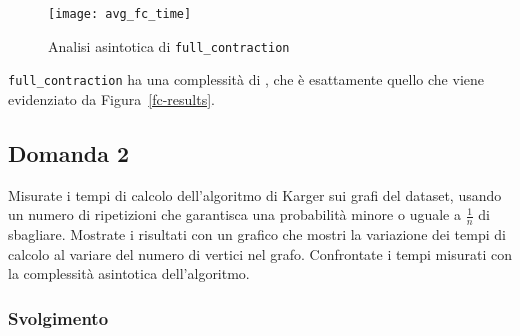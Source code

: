 
\begin{figure}[H]
	\centering
	\texttt{[image: avg\_fc\_time]}
	\caption{Analisi asintotica di \texttt{full\_contraction}}
	\label{fc-confronto}
\end{figure}

\texttt{full\_contraction} ha una complessità di , che è esattamente quello che viene evidenziato da Figura~\ref{fc-results}.

\subsection{Domanda 2}
Misurate i tempi di calcolo dell'algoritmo di Karger sui grafi del dataset, usando un numero di ripetizioni che garantisca una probabilità minore o uguale a $\frac{1}{n}$ di sbagliare. Mostrate i risultati con un grafico che mostri la variazione dei tempi di calcolo al variare del numero di vertici nel grafo. Confrontate i tempi misurati con la complessità asintotica dell'algoritmo.

\subsubsection{Svolgimento}

